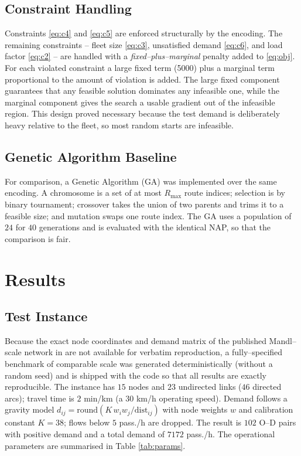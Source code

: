 \documentclass [a4paper, 11pt, titlepage] {article}
\begin{document}
\subsection{Constraint Handling}
Constraints \eqref{eq:c4} and \eqref{eq:c5} are enforced structurally by the
encoding. The remaining constraints -- fleet size \eqref{eq:c3}, unsatisfied
demand \eqref{eq:c6}, and load factor \eqref{eq:c2} -- are handled with a
\emph{fixed--plus--marginal} penalty added to \eqref{eq:obj}. For each violated
constraint a large fixed term (5000) plus a marginal term proportional to the
amount of violation is added. The large fixed component guarantees that any
feasible solution dominates any infeasible one, while the marginal component
gives the search a usable gradient out of the infeasible region. This design
proved necessary because the test demand is deliberately heavy relative to the
fleet, so most random starts are infeasible.

\subsection{Genetic Algorithm Baseline}
For comparison, a Genetic Algorithm (GA) \cite{pattnaik1998} was implemented over
the same encoding. A chromosome is a set of at most $R_{\max}$ route indices;
selection is by binary tournament; crossover takes the union of two parents and
trims it to a feasible size; and mutation swaps one route index. The GA uses a
population of $24$ for $40$ generations and is evaluated with the identical NAP,
so that the comparison is fair.

\section{Results}
\label{sec:results}

\subsection{Test Instance}
Because the exact node coordinates and demand matrix of the published
Mandl--scale network in \cite{fan2006} are not available for verbatim
reproduction, a fully--specified benchmark of comparable scale was generated
deterministically (without a random seed) and is shipped with the code so that
all results are exactly reproducible. The instance has $15$ nodes and $23$
undirected links ($46$ directed arcs); travel time is $2$ min/km (a $30$ km/h
operating speed). Demand follows a gravity model
$d_{ij}=\mathrm{round}(K\,w_i w_j / \mathrm{dist}_{ij})$ with node weights $w$
and calibration constant $K=38$; flows below $5$ pass./h are dropped. The result
is $102$ O--D pairs with positive demand and a total demand of $7172$ pass./h.
The operational parameters are summarised in Table \ref{tab:params}.
\end{document}
